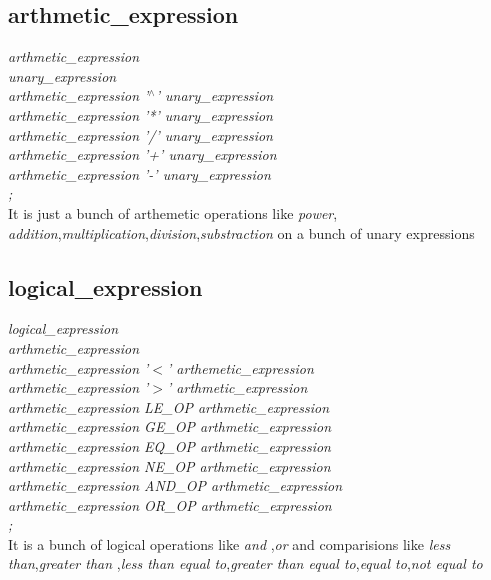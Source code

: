 \documentclass[11pt]{article}
\begin{document}
\subsection{arthmetic\_expression}
{\itshape
arthmetic\_expression\\
\hspace*{1cm}  unary\_expression\\
\hspace*{1cm}    arthmetic\_expression '$^\wedge$' unary\_expression\\
\hspace*{1cm}   arthmetic\_expression '*' unary\_expression\\
\hspace*{1cm}   arthmetic\_expression '/' unary\_expression\\
\hspace*{1cm}   arthmetic\_expression '+' unary\_expression\\
\hspace*{1cm}   arthmetic\_expression '-' unary\_expression\\
\hspace*{1cm};\\
}
It is just a bunch of arthemetic operations like \textit{power}, \textit{addition},\textit{multiplication},\textit{division},\textit{substraction} on a bunch of unary expressions
\subsection{logical\_expression}
{\itshape
logical\_expression\\
\hspace*{1cm} arthmetic\_expression\\
\hspace*{1cm}   arthmetic\_expression '$<$' arthemetic\_expression\\
\hspace*{1cm}   arthmetic\_expression '$>$' arthmetic\_expression\\
\hspace*{1cm}   arthmetic\_expression LE\_OP arthmetic\_expression\\
\hspace*{1cm}   arthmetic\_expression GE\_OP arthmetic\_expression\\
\hspace*{1cm}   arthmetic\_expression EQ\_OP arthmetic\_expression\\
\hspace*{1cm}   arthmetic\_expression NE\_OP arthmetic\_expression\\
\hspace*{1cm}   arthmetic\_expression AND\_OP arthmetic\_expression\\
\hspace*{1cm}   arthmetic\_expression OR\_OP arthmetic\_expression\\
\hspace*{1cm};\\
}
It is a bunch of logical operations like \textit{and} ,\textit{or} and comparisions like \textit{less than},\textit{greater than },\textit{less than equal to},\textit{greater than equal to},\textit{equal to},\textit{not equal to}
\end{document}
